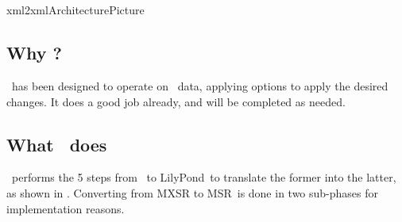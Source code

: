 



\chapter{\xmlToXml\ }

{xml2xmlArchitecturePicture}


\section{Why \xmlToXml?}

\xmlToXml\ has been designed to operate on \mxml\ data, applying options to apply the desired changes. It does a good job already, and will be completed as needed.


\section{What \xmlToXml\ does}

\xmlToXml\ performs the 5 steps from \mxml\ to LilyPond\ to translate the former into the latter, as shown in . Converting from MXSR to MSR\ is done in two sub-phases for implementation reasons.

